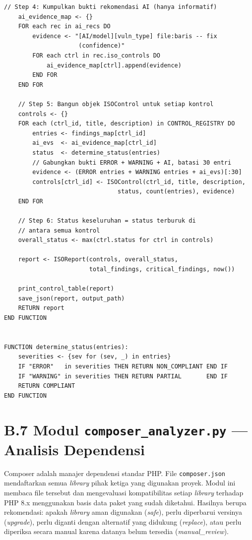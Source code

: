 \begin{lstlisting}[style=pseudocodestyle]
    // Step 4: Kumpulkan bukti rekomendasi AI (hanya informatif)
    ai_evidence_map <- {}
    FOR each rec in ai_recs DO
        evidence <- "[AI/model][vuln_type] file:baris -- fix 
                     (confidence)"
        FOR each ctrl in rec.iso_controls DO
            ai_evidence_map[ctrl].append(evidence)
        END FOR
    END FOR

    // Step 5: Bangun objek ISOControl untuk setiap kontrol
    controls <- {}
    FOR each (ctrl_id, title, description) in CONTROL_REGISTRY DO
        entries <- findings_map[ctrl_id]
        ai_evs  <- ai_evidence_map[ctrl_id]
        status  <- determine_status(entries)
        // Gabungkan bukti ERROR + WARNING + AI, batasi 30 entri
        evidence <- (ERROR entries + WARNING entries + ai_evs)[:30]
        controls[ctrl_id] <- ISOControl(ctrl_id, title, description,
                                status, count(entries), evidence)
    END FOR

    // Step 6: Status keseluruhan = status terburuk di 
    // antara semua kontrol
    overall_status <- max(ctrl.status for ctrl in controls)

    report <- ISOReport(controls, overall_status,
                        total_findings, critical_findings, now())

    print_control_table(report)
    save_json(report, output_path)
    RETURN report
END FUNCTION


FUNCTION determine_status(entries):
    severities <- {sev for (sev, _) in entries}
    IF "ERROR"   in severities THEN RETURN NON_COMPLIANT END IF
    IF "WARNING" in severities THEN RETURN PARTIAL       END IF
    RETURN COMPLIANT
END FUNCTION
\end{lstlisting}

\section*{B.7 Modul \texttt{composer\_analyzer.py} --- Analisis Dependensi}

Composer adalah manajer dependensi standar PHP. File \texttt{composer.json}
mendaftarkan semua \textit{library} pihak ketiga yang digunakan proyek.
Modul ini membaca file tersebut dan mengevaluasi kompatibilitas setiap
\textit{library} terhadap PHP 8.x menggunakan basis data paket yang sudah
diketahui. Hasilnya berupa rekomendasi: apakah \textit{library} aman digunakan
(\textit{safe}), perlu diperbarui versinya (\textit{upgrade}), perlu diganti
dengan alternatif yang didukung (\textit{replace}), atau perlu diperiksa
secara manual karena datanya belum tersedia (\textit{manual\_review}).

